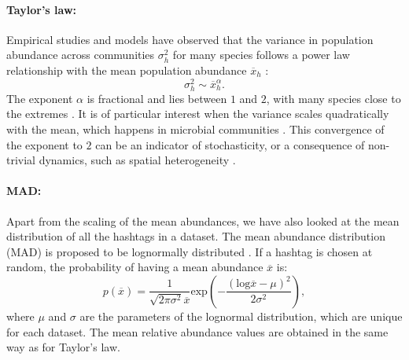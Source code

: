 \paragraph{Taylor's law:} 
Empirical studies and models have observed that the variance in population abundance across communities $\sigma_h^2$ for many species follows a power law relationship with the mean population abundance $\overline{x}_h$ \cite{taylor1961aggregation,grilli2020macroecological}:
\begin{equation}
    \sigma_h^2 \sim \overline{x}_h^{\alpha}.
\end{equation}
The exponent $\alpha$ is fractional and lies between $1$ and $2$, with many species close to the extremes \cite{anderson1982variability}. It is of particular interest when the variance scales quadratically with the mean, which happens in microbial communities \cite{grilli2020macroecological}. This convergence of the exponent to $2$ can be an indicator of  stochasticity, or a consequence of non-trivial dynamics, such as spatial heterogeneity \cite{keeling2000simple}.


\paragraph{MAD:}  Apart from the scaling of the mean abundances, we have also looked at the mean distribution of all the hashtags in a dataset. The mean abundance distribution (MAD) is proposed to be lognormally distributed \cite{grilli2020macroecological}. If a hashtag is chosen at random, the probability of having a mean abundance $\overline{x}$ is:
\begin{equation}
    p(\overline{x}) = \frac{1}{\sqrt{2 \pi \sigma^2} \overline{x}}
    \textrm{exp} \left( -\frac{(\textrm{log}\overline{x} - \mu)^2}{2\sigma^2} \right),
\end{equation}
where $\mu$ and $\sigma$ are the parameters of the lognormal distribution, which are unique for each dataset. The mean relative abundance values are obtained in the same way as for Taylor's law. 

